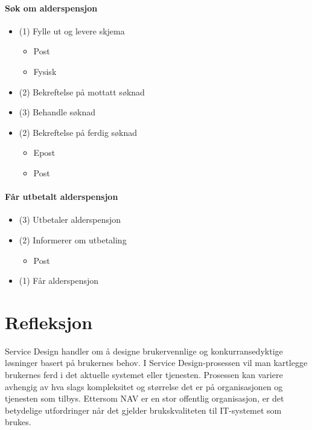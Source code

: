 \documentclass[informationsecurity]{gucmasterproject}
\begin{document}
\subsubsection{Søk om alderspensjon}
\begin{itemize}
\item (1) Fylle ut og levere skjema
	\begin{itemize}
	\item Post
	\item Fysisk
	\end{itemize}
\item (2) Bekreftelse på mottatt søknad
\item (3) Behandle søknad
\item (2) Bekreftelse på ferdig søknad
	\begin{itemize}
	\item Epost
	\item Post
	\end{itemize}
\end{itemize}

\subsubsection{Får utbetalt alderspensjon}
\begin{itemize}
\item (3) Utbetaler alderspensjon
\item (2) Informerer om utbetaling
	\begin{itemize}
	\item Post
	\end{itemize}
\item (1) Får alderspensjon
\end{itemize}




\chapter{Refleksjon}
Service Design handler om å designe brukervennlige og konkurransedyktige løsninger basert på brukernes behov. I Service Design-prosessen vil man kartlegge brukernes ferd i det aktuelle systemet eller tjenesten. Prosessen kan variere avhengig av hva slags kompleksitet og størrelse det er på organisasjonen og tjenesten som tilbys. Ettersom NAV er en stor offentlig organisasjon, er det betydelige utfordringer når det gjelder brukskvaliteten til IT-systemet som brukes.
\end{document}

